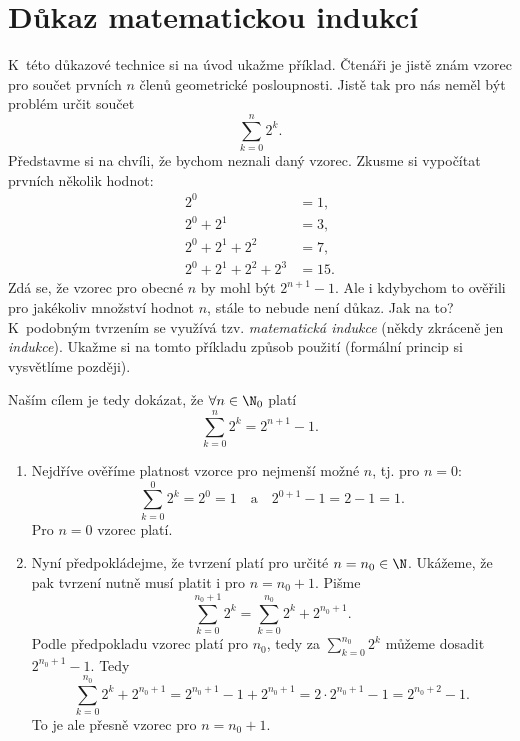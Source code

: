 \section{Důkaz matematickou indukcí}\label{sec:dukaz_indukci}
K~této důkazové technice si na úvod ukažme příklad. Čtenáři je jistě znám vzorec pro součet prvních $n$ členů geometrické posloupnosti. Jistě tak pro nás neměl být problém určit součet
\begin{equation*}
    \sum_{k=0}^{n}{2^k}.
\end{equation*}
Představme si na chvíli, že bychom neznali daný vzorec. Zkusme si vypočítat prvních několik hodnot:
\begin{align*}
    2^0&=1,\\
    2^0+2^1&=3,\\
    2^0+2^1+2^2&=7,\\
    2^0+2^1+2^2+2^3&=15.
\end{align*}
Zdá se, že vzorec pro obecné $n$ by mohl být $2^{n+1}-1$. Ale i kdybychom to ověřili pro jakékoliv množství hodnot $n$, stále to nebude není důkaz. Jak na to? K~podobným tvrzením se využívá tzv. \emph{matematická indukce} (někdy zkráceně jen \emph{indukce}). Ukažme si na tomto příkladu způsob použití (formální princip si vysvětlíme později).\par
Naším cílem je tedy dokázat, že $\forall n\in\N_0$ platí
\begin{equation*}
    \sum_{k=0}^{n}{2^k}=2^{n+1}-1.
\end{equation*}
\begin{enumerate}[label=(\roman*)]
    \item\label{item:zaklad_indukce} Nejdříve ověříme platnost vzorce pro nejmenší možné $n$, tj. pro $n=0$:
    \begin{equation*}
        \sum_{k=0}^{0}{2^k}=2^0=1\quad\text{a}\quad2^{0+1}-1=2-1=1.
    \end{equation*}
    Pro $n=0$ vzorec platí.
    \item\label{item:indukcni_krok} Nyní předpokládejme, že tvrzení platí pro určité $n=n_0\in\N$. Ukážeme, že pak tvrzení nutně musí platit i pro $n=n_0+1$. Pišme
    \begin{equation*}
        \sum_{k=0}^{n_0+1}{2^k}=\sum_{k=0}^{n_0}{2^k}+2^{n_0+1}.
    \end{equation*}
    Podle předpokladu vzorec platí pro $n_0$, tedy za $\sum_{k=0}^{n_0}{2^k}$ můžeme dosadit $2^{n_0+1}-1$. Tedy
    \begin{equation*}
        \sum_{k=0}^{n_0}{2^k}+2^{n_0+1}=2^{n_0+1}-1+2^{n_0+1}=2\cdot 2^{n_0+1}-1=2^{n_0+2}-1.
    \end{equation*}
    To je ale přesně vzorec pro $n=n_0+1$.
\end{enumerate}
